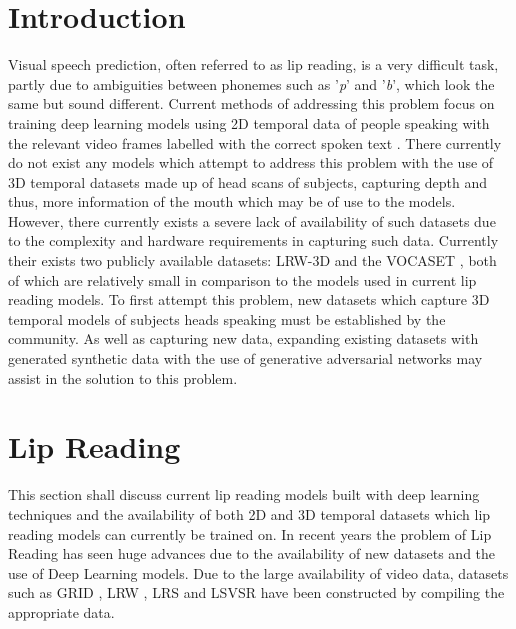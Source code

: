 \documentclass[12pt]{article}
\begin{document}


\setcounter{page}{1}
\clearpage{\pagestyle{empty}\cleardoublepage}

\tableofcontents 
\clearpage{\pagestyle{empty}\cleardoublepage}


\setcounter{page}{1}

\section{Introduction}

Visual speech prediction, often referred to as lip reading, is a very difficult task, partly due to ambiguities between phonemes such as '\textit{p}' and '\textit{b}', which look the same but sound different.
Current methods of addressing this problem focus on training deep learning models using 2D temporal data of people speaking with the relevant video frames labelled with the correct spoken text \cite{Chung2016, Assael2016, Chung2017, Shillingford2018}.
There currently do not exist any models which attempt to address this problem with the use of 3D temporal datasets made up of head scans of subjects, capturing depth and thus, more information of the mouth which may be of use to the models.
However, there currently exists a severe lack of availability of such datasets due to the complexity and hardware requirements in capturing such data.
Currently their exists two publicly available datasets: LRW-3D \cite{Tzirakis2019} and the VOCASET \cite{Cudeiro2019}, both of which are relatively small in comparison to the models used in current lip reading models.
To first attempt this problem, new datasets which capture 3D temporal models of subjects heads speaking must be established by the community.
As well as capturing new data, expanding existing datasets with generated synthetic data with the use of generative adversarial networks may assist in the solution to this problem.

\section{Lip Reading}
This section shall discuss current lip reading models built with deep learning techniques and the availability of both 2D and 3D temporal datasets which lip reading models can currently be trained on.
In recent years the problem of Lip Reading has seen huge advances due to the availability of new datasets and the use of Deep Learning models.
Due to the large availability of video data, datasets such as GRID \cite{Cooke2006}, LRW \cite{Chung2016}, LRS \cite{Chung2017} and LSVSR \cite{Shillingford2018} have been constructed by compiling the appropriate data.
\end{document}
